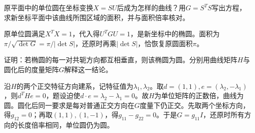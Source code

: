 原平面中的单位圆在坐标变换\(X=SU\)后成为怎样的曲线？用\(G=S^TS\)写出方程，求新坐标平面中该曲线所围区域的面积，并与面积倍率核对。
\par
\solutionanswer
原单位圆满足\(X^TX=1\)，代入得\(U^TGU=1\)，是新坐标中的椭圆。面积为\(\pi/\sqrt{\det G}=\pi/|\det S|\)，还原时再乘\(|\det S|\)，恰恢复原圆面积\(\pi\)。


证明：若椭圆的每一对共轭方向都互相垂直，则该椭圆为圆。分别用曲线矩阵\(H\)与圆化后的度量矩阵\(G\)解释这一结论。
\par
\solutionanswer
沿\(H\)的两个正交特征方向建系，记特征值为\(\lambda_1,\lambda_2\)。取\(d=(1,1),e=(\lambda_2,-\lambda_1)\)，则\(d^THe=0\)，题设迫使\(d\cdot e=\lambda_2-\lambda_1=0\)。故\(H\)为单位矩阵的正数倍，曲线为圆。圆化后同一要求是每对普通正交方向在\(G\)度量下仍正交。先取两个坐标方向，得\(g_{12}=0\)；再取\((1,1),(1,-1)\)，得\(g_{11}-g_{22}=0\)。于是\(G=g_{11}I\)，还原时所有方向的长度倍率相同，单位圆仍为圆。
\par
